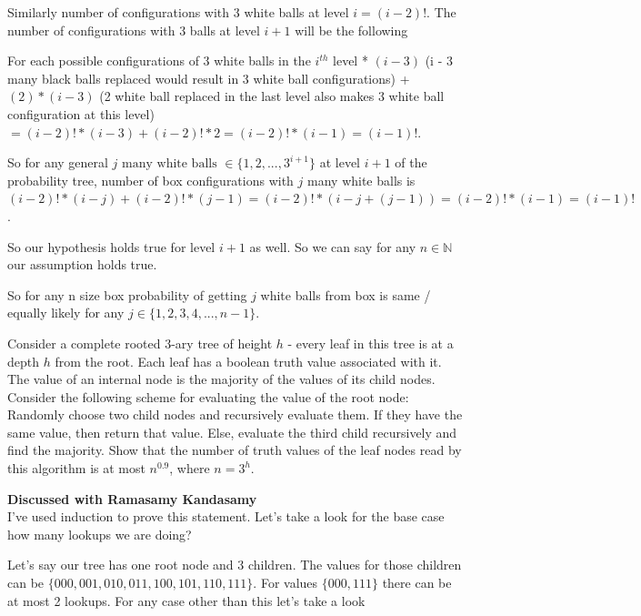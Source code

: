\documentclass[addpoints,12pt]{exam}
\begin{document}
\begin{questions}
\begin{solution}
            Similarly number of configurations with 3 white balls at level $i = (i-2)!$. The number of configurations with 3 balls at level $i+1$ will be the following

            For each possible configurations of 3 white balls in the $i^{th}$ level * $(i-3)$ (i - 3 many black balls replaced would result in 3 white ball configurations) + $(2) * (i - 3)$ (2 white ball replaced in the last level also makes 3 white ball configuration at this level) $= (i-2)! * (i-3) + (i-2)! * 2 = (i-2)! * (i - 1) = (i-1)!$.

            So for any general $j \text{ many white balls } \in \{1, 2, ..., 3^{i + 1}\}$ at level $i + 1$ of the probability tree, number of box configurations with $j$ many white balls is $(i-2)! * (i-j) + (i-2)! * (j-1) = (i-2)! *(i-j + (j - 1)) = (i-2)! * (i-1) = (i-1)!$.

            So our hypothesis holds true for level $i+1$ as well. So we can say for any $n \in \mathbb{N}$ our assumption holds true.

            So for any n size box probability of getting $j$ white balls from box is same / equally likely for any $j \in \{1,2,3,4, ..., n - 1\}$.
            
		\end{solution}
	
		\question[5] Consider a complete rooted $3$-ary tree of height $h$ - every leaf in this tree is at a depth $h$ from the root. Each leaf has a boolean truth value associated with it. The value of an internal node is the majority of the values of its child nodes. Consider the following scheme for evaluating the value of the root node: Randomly choose two child nodes and recursively evaluate them. If they have the same value, then return that value. Else, evaluate the third child recursively and find the majority. Show that the number of truth values of the leaf nodes read by this algorithm is at most $n^{0.9}$, where $n = 3^h$.
		\begin{solution} \textbf{Discussed with Ramasamy Kandasamy}\\
			I've used induction to prove this statement. Let's take a look for the base case how many lookups we are doing?

            Let's say our tree has one root node and 3 children. The values for those children can be $\{000,001,010,011, 100,101,110,111\}$. For values $\{000,111\}$ there can be at most 2 lookups. For any case other than this let's take a look


\end{solution}
\end{questions}
\end{document}
